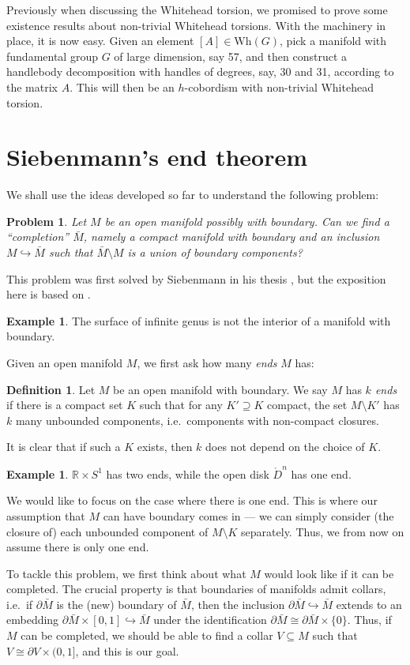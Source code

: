\documentclass[a4paper, 12pt]{article}
\newtheorem{problem}[thm]{Problem}
\theoremstyle{definition}
\newtheorem{defi}[thm]{Definition}
\newtheorem{eg}[thm]{Example}
\newcommand\R{\mathbb{R}}
\newcommand\Wh{\mathrm{Wh}}
\begin{document}
Previously when discussing the Whitehead torsion, we promised to prove some existence results about non-trivial Whitehead torsions. With the machinery in place, it is now easy. Given an element $[A] \in \Wh(G)$, pick a manifold with fundamental group $G$ of large dimension, say 57, and then construct a handlebody decomposition with handles of degrees, say, 30 and 31, according to the matrix $A$. This will then be an $h$-cobordism with non-trivial Whitehead torsion.

\section{Siebenmann's end theorem}\label{sec:siebenmann}
We shall use the ideas developed so far to understand the following problem:
\begin{problem}
  Let $M$ be an open manifold possibly with boundary. Can we find a ``completion'' $\bar{M}$, namely a compact manifold with boundary and an inclusion $M \hookrightarrow \bar{M}$ such that $\bar{M} \setminus M$ is a union of boundary components?
\end{problem}
This problem was first solved by Siebenmann in his thesis \cite{siebenmann-thesis}, but the exposition here is based on \cite[Chapter 12]{steve-ferry}.

\begin{eg}
  The surface of infinite genus is not the interior of a manifold with boundary.
\end{eg}

Given an open manifold $M$, we first ask how many \emph{ends} $M$ has:
\begin{defi}
  Let $M$ be an open manifold with boundary. We say $M$ has \emph{$k$ ends} if there is a compact set $K$ such that for any $K' \supseteq K$ compact, the set $M \setminus K'$ has $k$ many unbounded components, i.e.\ components with non-compact closures.
\end{defi}
It is clear that if such a $K$ exists, then $k$ does not depend on the choice of $K$.
\begin{eg}
  $\R \times S^1$ has two ends, while the open disk $\mathring{D}^n$ has one end.
\end{eg}
We would like to focus on the case where there is one end. This is where our assumption that $M$ can have boundary comes in --- we can simply consider (the closure of) each unbounded component of $M \setminus K$ separately. Thus, we from now on assume there is only one end.

To tackle this problem, we first think about what $M$ would look like if it can be completed. The crucial property is that boundaries of manifolds admit collars, i.e.\ if $\partial \bar{M}$ is the (new) boundary of $\bar{M}$, then the inclusion $\partial \bar{M} \hookrightarrow \bar{M}$ extends to an embedding $\partial \bar{M} \times [0, 1] \hookrightarrow \bar{M}$ under the identification $\partial \bar{M} \cong \partial \bar{M} \times \{0\}$. Thus, if $M$ can be completed, we should be able to find a collar $V \subseteq M$ such that $V \cong \partial V \times (0, 1]$, and this is our goal.
\end{document}

